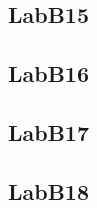 \documentclass{article}
\begin{document}
\subsection{LabB15}


\subsection{LabB16}

\pagebreak

\subsection{LabB17}


\subsection{LabB18}


\end{document}
